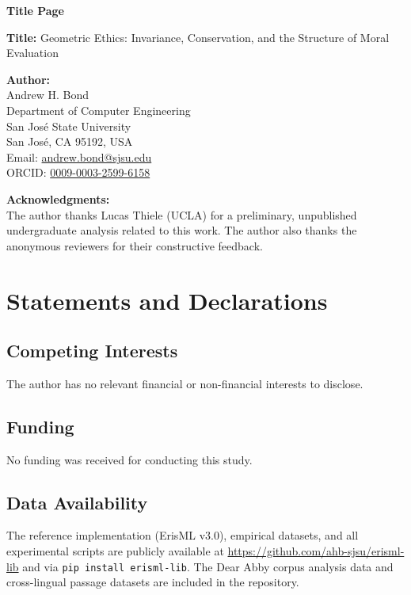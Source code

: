 \documentclass[12pt]{article}
\begin{document}
\begin{center}
{\LARGE\bfseries Title Page}
\end{center}

\bigskip

\noindent\textbf{Title:} Geometric Ethics: Invariance, Conservation, and the Structure of Moral Evaluation

\bigskip

\noindent\textbf{Author:}\\
Andrew H. Bond\\
Department of Computer Engineering\\
San Jos\'{e} State University\\
San Jos\'{e}, CA 95192, USA\\
Email: \href{mailto:andrew.bond@sjsu.edu}{andrew.bond@sjsu.edu}\\
ORCID: \href{https://orcid.org/0009-0003-2599-6158}{0009-0003-2599-6158}

\bigskip

\noindent\textbf{Acknowledgments:}\\
The author thanks Lucas Thiele (UCLA) for a preliminary, unpublished undergraduate analysis related to this work. The author also thanks the anonymous reviewers for their constructive feedback.

\bigskip

\section*{Statements and Declarations}

\subsection*{Competing Interests}
The author has no relevant financial or non-financial interests to disclose.

\subsection*{Funding}
No funding was received for conducting this study.

\subsection*{Data Availability}
The reference implementation (ErisML v3.0), empirical datasets, and all experimental scripts are publicly available at \url{https://github.com/ahb-sjsu/erisml-lib} and via \texttt{pip install erisml-lib}. The Dear Abby corpus analysis data and cross-lingual passage datasets are included in the repository.
\end{document}
